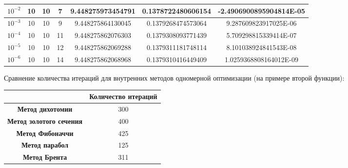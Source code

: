 \documentclass[12pt]{article}
\begin{document}
\begin{table}[H]
\begin{tabular}{|c|c|c|c|c|c|c|}
$10^{-2}$ & 10 & 10 & 7    & 9.448275973454791   & 0.1378722480606154  & -2.4906900895904814E-05 \\ \hline
$10^{-3}$ & 10 & 10 & 9    & 9.448275864130045   & 0.1379268474573064  & 9.287609823917025E-06   \\ \hline
$10^{-4}$ & 10 & 10 & 11   & 9.448275862076303   & 0.1379308093771439  & 5.709298815339414E-07   \\ \hline
$10^{-5}$ & 10 & 10 & 12   & 9.448275862069288   & 0.1379311181748114  & 8.101038924841543E-08   \\ \hline
$10^{-6}$ & 10 & 10 & 14   & 9.448275862068968   & 0.1379310416449409  & 1.0259368808164012E-09  \\ \hline
\end{tabular}
\end{table}

Сравнение количества итераций для внутренних методов одномерной оптимизации (на примере второй функции):

\begin{table}[h]
\centering
\begin{tabular}{|
>{\columncolor[HTML]{EED9C4}}c |c|}
\hline
\cellcolor[HTML]{EDE9E2}\textbf{} & \cellcolor[HTML]{FFF0DB}\textbf{Количество итераций} \\ \hline
\textbf{Метод дихотомии}        & 300 \\ \hline
\textbf{Метод золотого сечения} & 400 \\ \hline
\textbf{Метод Фибоначчи}        & 425 \\ \hline
\textbf{Метод парабол}          & 125 \\ \hline
\textbf{Метод Брента}           & 311 \\ \hline
\end{tabular}
\end{table}
\end{document}
